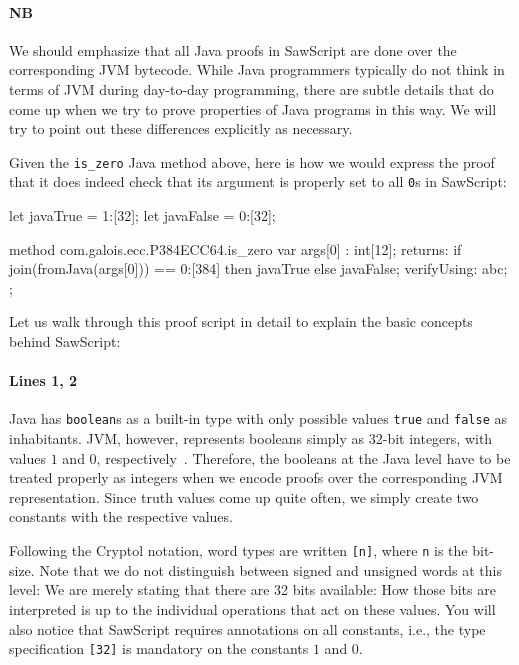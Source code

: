 \documentclass[12pt]{galois-whitepaper}
\newcommand{\sawScript}{{\sc SawScript}\xspace}
\begin{document}
\paragraph{NB} We should emphasize that all Java proofs in \sawScript are done over the corresponding JVM bytecode. While Java programmers
typically do not think in terms of JVM during day-to-day programming, there are subtle details that do come up when
we try to prove properties of Java programs in this way. We will try to point out these differences explicitly as necessary.

Given the {\tt is\_zero} Java method above, here is how we would express the proof that it does indeed check that
its argument is properly set to all {\tt 0}s in \sawScript:

\begin{code}[numbers=left]
  let javaTrue  = 1:[32];
  let javaFalse = 0:[32];
  
  method com.galois.ecc.P384ECC64.is_zero {
    var args[0] : int[12];
    returns: 
        if join(fromJava(args[0])) == 0:[384]
        then javaTrue
        else javaFalse;
    verifyUsing: abc;
  };
\end{code}
Let us walk through this proof script in detail to explain the basic concepts behind \sawScript:

\paragraph{Lines 1, 2} Java has {\tt boolean}s as a built-in type with only possible values {\tt true} and {\tt false}
as inhabitants. JVM, however,
represents booleans simply as 32-bit integers, with values $1$ and $0$, respectively~\cite[Section 3.3.4]{Lindholm:1999:JVM:553607}.
Therefore, the booleans at the Java level have to be treated properly as integers when we encode proofs over the corresponding JVM
representation.  Since truth values come up quite often, we simply create two constants with the respective values. 

Following the Cryptol notation, word types are written {\tt [n]}, where {\tt n}
is the bit-size. Note that we do not distinguish between signed and unsigned words at this level: We are merely stating that there are 32
bits available: How those bits are interpreted is up to the individual operations that act on these values. You will also notice that
\sawScript requires annotations on all constants, i.e., the type specification {\tt [32]} is mandatory on the constants $1$ and $0$.
\end{document}
